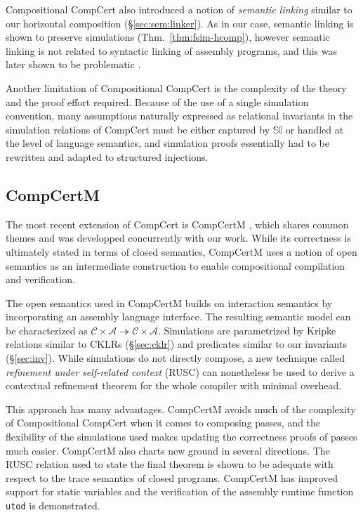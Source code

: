 \documentclass[draft,11pt]{report}
\theoremstyle{definition}
\begin{document}
Compositional CompCert also introduced a notion of \emph{semantic linking}
similar to our horizontal composition
(\S\ref{sec:sem:linker}).
As in our case,
semantic linking is shown to preserve simulations
(Thm.~\ref{thm:fsim-hcomp}),
however semantic linking is not related to
syntactic linking of assembly programs,
and this was later shown to be problematic \citep{compcertm}.

Another limitation of Compositional CompCert
is the complexity of the theory
and the proof effort required.
Because of the use of a single simulation convention,
many assumptions naturally expressed as
relational invariants in the simulation relations of CompCert
must be either captured by $\mathbb{SI}$
or handled at the level of language semantics,
and simulation proofs
essentially had to be rewritten and adapted to
structured injections.


\subsection{CompCertM} %

The most recent extension of CompCert is CompCertM \citep{compcertm},
which shares common themes and was developped concurrently
with our work.
While its correctness
is ultimately stated in terms of closed semantics,
CompCertM uses a notion of open semantics
as an intermediate construction
to enable compositional compilation and verification.

The open semantics used in CompCertM
builds on interaction semantics
by incorporating an assembly language interface.
The resulting semantic model can be characterized as
$\mathcal{C} \times \mathcal{A} \twoheadrightarrow
 \mathcal{C} \times \mathcal{A}$.
Simulations
are parametrized by Kripke relations similar to CKLRs (\S\ref{sec:cklr})
and predicates similar to our invariants (\S\ref{sec:inv}).
While simulations do not directly compose,
a new technique called \emph{refinement under self-related context}
(RUSC)
can nonetheless be used to derive a contextual refinement theorem
for the whole compiler with minimal overhead.

This approach has many advantages.
CompCertM avoids much of the complexity
of Compositional CompCert
when it comes to composing passes,
and the flexibility of the simulations used
makes updating the correctness proofs of passes much easier.
CompCertM also charts new ground in several directions.
The RUSC relation used to state the final theorem
is shown to be adequate with respect to the trace semantics
of closed programs.
CompCertM has improved support for static variables
and the verification of
the assembly runtime function \texttt{utod} is demonstrated.
\end{document}
